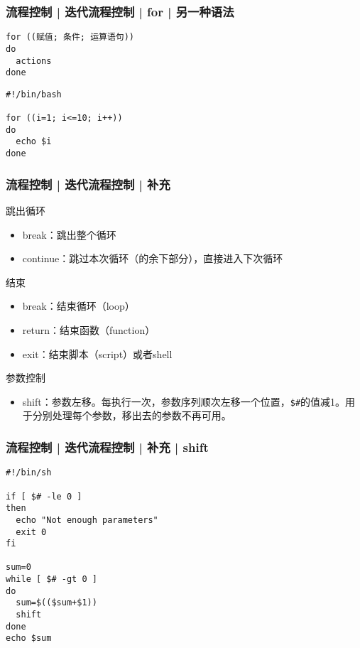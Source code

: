 \begin{frame}[fragile]
  \frametitle{流程控制 | 迭代流程控制 | for | \alert{另一种语法}}
\begin{lstlisting}
for ((赋值; 条件; 运算语句))
do
  actions
done
\end{lstlisting}
\pause
\begin{lstlisting}
#!/bin/bash

for ((i=1; i<=10; i++))
do
  echo $i
done
\end{lstlisting}
\end{frame}

\begin{frame}[fragile]
  \frametitle{流程控制 | 迭代流程控制 | \alert{补充}}
  \begin{block}{跳出循环}
    \begin{itemize}
      \item break：跳出整个循环
      \item continue：跳过本次循环（的余下部分），直接进入下次循环
    \end{itemize}
  \end{block}
  \pause
  \begin{block}{结束}
    \begin{itemize}
      \item break：结束循环（loop）
      \item return：结束函数（function）
      \item exit：结束脚本（script）或者shell
    \end{itemize}
  \end{block}
  \pause
  \begin{block}{参数控制}
    \begin{itemize}
      \item shift：参数左移。每执行一次，参数序列顺次左移一个位置，\verb|$#|的值减1。用于分别处理每个参数，移出去的参数不再可用。
    \end{itemize}
  \end{block}
\end{frame}

\begin{frame}[fragile]
  \frametitle{流程控制 | 迭代流程控制 | 补充 | shift}
\begin{lstlisting}
#!/bin/sh

if [ $# -le 0 ]
then
  echo "Not enough parameters"
  exit 0
fi

sum=0
while [ $# -gt 0 ]
do
  sum=$(($sum+$1))
  shift
done
echo $sum
\end{lstlisting}
\end{frame}

